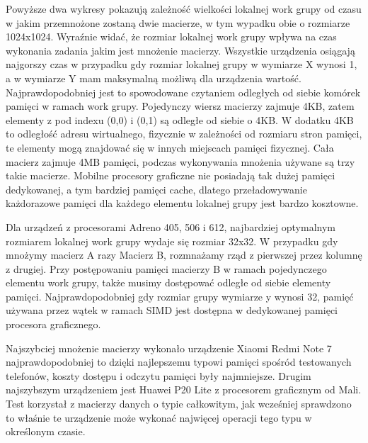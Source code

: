 Powyższe dwa wykresy pokazują zależność wielkości lokalnej work grupy od czasu w jakim przemnożone zostaną dwie macierze, w tym wypadku obie o rozmiarze 1024x1024. Wyraźnie widać, że rozmiar lokalnej work grupy wpływa na czas wykonania zadania jakim jest mnożenie macierzy. Wszystkie urządzenia osiągają najgorszy czas w przypadku gdy rozmiar lokalnej grupy w wymiarze X wynosi 1, a w wymiarze Y mam maksymalną możliwą dla urządzenia wartość. Najprawdopodobniej jest to spowodowane czytaniem odległych od siebie komórek pamięci w ramach work grupy. Pojedynczy wiersz macierzy zajmuje 4KB, zatem elementy z pod indexu (0,0) i (0,1) są odległe od siebie o 4KB. W dodatku 4KB to odległość adresu wirtualnego, fizycznie w zależności od rozmiaru stron pamięci, te elementy mogą znajdować się w innych miejscach pamięci fizycznej. Cała macierz zajmuje 4MB pamięci, podczas wykonywania mnożenia używane są trzy takie macierze. Mobilne procesory graficzne nie posiadają tak dużej  pamięci dedykowanej, a tym bardziej pamięci cache, dlatego przeładowywanie każdorazowe pamięci dla każdego elementu lokalnej grupy jest bardzo kosztowne. 

Dla urządzeń z procesorami Adreno 405, 506 i 612, najbardziej optymalnym rozmiarem lokalnej work grupy wydaje się rozmiar 32x32. W przypadku gdy mnożymy macierz A razy Macierz B, rozmnażamy rząd z pierwszej przez kolumnę z drugiej. Przy postępowaniu pamięci macierzy B w ramach pojedynczego elementu work grupy, także musimy dostępować odległe od siebie elementy pamięci. Najprawdopodobniej gdy rozmiar grupy  wymiarze y wynosi 32, pamięć używana przez wątek w ramach SIMD jest dostępna w dedykowanej pamięci procesora graficznego. 

Najszybciej mnożenie macierzy wykonało urządzenie Xiaomi Redmi Note 7 najprawdopodobniej to dzięki najlepszemu typowi pamięci spośród testowanych telefonów, koszty dostępu i odczytu pamięci były najmniejsze. Drugim najszybszym urządzeniem jest Huawei P20 Lite z procesorem graficznym od Mali. Test korzystał z macierzy danych o typie całkowitym, jak wcześniej sprawdzono to właśnie te urządzenie może wykonać najwięcej operacji tego typu w określonym czasie.
